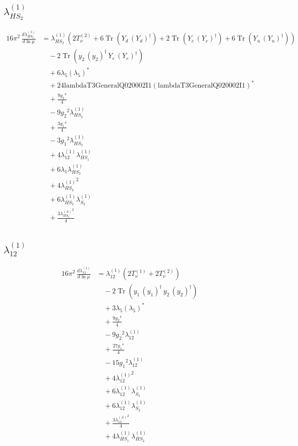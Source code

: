 \documentclass[10pt,a4paper]{article}
\begin{document}
\subsection*{$\lambda_{HS_2}^{(1)}$}
\begin{align*}
16\pi^2\,\frac{d \lambda_{HS_2}^{(1)}}{d\ln\mu} &={\lambda_{HS_2}^{(1)}} (2 T_{\nu}^{(2)}+6 \operatorname{Tr}\!\left({Y_d}\,\left({Y_d}\right)^{\dagger}\right)+2 \operatorname{Tr}\!\left({Y_e}\,\left({Y_e}\right)^{\dagger}\right)+6 \operatorname{Tr}\!\left({Y_u}\,\left({Y_u}\right)^{\dagger}\right)) \\
&\quad -2 \operatorname{Tr}\!\left({y_2}\,\left({y_2}\right)^{\dagger}\,{Y_e}\,\left({Y_e}\right)^{\dagger}\right) \\
&\quad +6 {\lambda_5} \left({\lambda_5}\right)^{*} \\
&\quad +24 \text{lambdaT3GeneralQ020002I1} \left(\text{lambdaT3GeneralQ020002I1}\right)^{*} \\
&\quad +\frac{9 {g_2}^4}{4} \\
&\quad -9 {g_2}^2 {\lambda_{HS_2}^{(1)}} \\
&\quad +\frac{3 {g_1}^4}{4} \\
&\quad -3 {g_1}^2 {\lambda_{HS_2}^{(1)}} \\
&\quad +4 {\lambda_{12}^{(1)}} {\lambda_{HS_1}^{(1)}} \\
&\quad +6 {\lambda_1} {\lambda_{HS_2}^{(1)}} \\
&\quad +4 {\lambda_{HS_2}^{(1)}}^2 \\
&\quad +6 {\lambda_{HS_2}^{(1)}} {\lambda_{S_2}^{(1)}} \\
&\quad +\frac{3 {\lambda_{HS_2}^{(A)}}^2}{4} \\
\end{align*}
\subsection*{$\lambda_{12}^{(1)}$}
\begin{align*}
16\pi^2\,\frac{d \lambda_{12}^{(1)}}{d\ln\mu} &={\lambda_{12}^{(1)}} (2 T_{\nu}^{(1)}+2 T_{\nu}^{(2)}) \\
&\quad -2 \operatorname{Tr}\!\left({y_1}\,\left({y_1}\right)^{\dagger}\,{y_2}\,\left({y_2}\right)^{\dagger}\right) \\
&\quad +3 {\lambda_5} \left({\lambda_5}\right)^{*} \\
&\quad +\frac{9 {g_2}^4}{4} \\
&\quad -9 {g_2}^2 {\lambda_{12}^{(1)}} \\
&\quad +\frac{27 {g_1}^4}{4} \\
&\quad -15 {g_1}^2 {\lambda_{12}^{(1)}} \\
&\quad +4 {\lambda_{12}^{(1)}}^2 \\
&\quad +6 {\lambda_{12}^{(1)}} {\lambda_{S_1}^{(1)}} \\
&\quad +6 {\lambda_{12}^{(1)}} {\lambda_{S_2}^{(1)}} \\
&\quad +\frac{3 {\lambda_{12}^{(A)}}^2}{4} \\
&\quad +4 {\lambda_{HS_1}^{(1)}} {\lambda_{HS_2}^{(1)}} \\
\end{align*}
\end{document}
